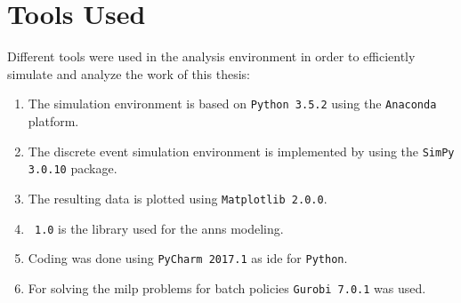 \chapter{Tools Used}

Different tools were used in the analysis environment in order to efficiently simulate and analyze the work of this thesis:

\begin{enumerate}
	\item The simulation environment is based on \texttt{Python 3.5.2} using the \texttt{Anaconda} platform.
	\item The discrete event simulation environment is implemented by using the \texttt{SimPy 3.0.10} package.
	\item The resulting data is plotted using \texttt{Matplotlib 2.0.0}.
	\item \texttt{ 1.0} is the library used for the \glspl{ann} modeling.
	\item Coding was done using \texttt{PyCharm 2017.1} as \gls{ide} for \texttt{Python}.
	\item For solving the \gls{milp} problems for batch policies \texttt{Gurobi 7.0.1} was used.
\end{enumerate}